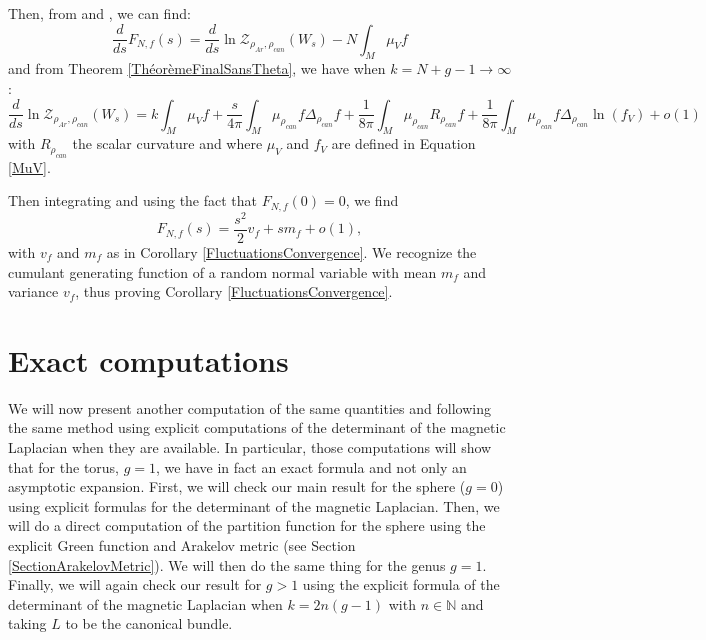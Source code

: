 \documentclass{article}
\theoremstyle{definition}
\theoremstyle{remark}
\begin{document}
Then, from \cite[Section 1.3.1]{ameur2025freeenergyfluctuationsrandom} and \cite[Section 1.3.2]{ameur2025twodimensionalcoulombgasfluctuations}, we can find: $$ \frac{d}{ds} F_{N,f}(s)=\frac{d}{ds} \ln \mathcal{Z}_{\rho_{Ar},\rho_{can}}(W_{s})-N\int_{M} \mu_{V}f $$ and from Theorem \ref{ThéorèmeFinalSansTheta}, we have when $k=N+g-1\to \infty$: $$\frac{d}{ds}\ln \mathcal{Z}_{\rho_{Ar},\rho_{can}}(W_{s})=k\int_{M} \mu_{V} f + \frac{s}{4\pi}\int_{M} \mu_{\rho_{can}} f \Delta_{\rho_{can}} f +\frac{1}{8\pi}\int_{M}\mu_{\rho_{can}}R_{\rho_{can}}f+\frac{1}{8\pi}\int_{M} \mu_{\rho_{can}} f\Delta_{\rho_{can}}\ln(f_{V})+o(1) $$ with $R_{\rho_{can}}$ the scalar curvature and where $\mu_{V}$ and $f_{V}$ are defined in Equation \eqref{MuV}.

Then integrating and using the fact that $F_{N,f}(0)=0$, we find $$F_{N,f}(s) = \frac{s^{2}}{2}v_{f}+sm_{f}+o(1), $$ with $v_{f}$ and $m_{f}$ as in Corollary \ref{FluctuationsConvergence}. We recognize the cumulant generating function of a random normal variable with mean $m_{f}$ and variance $v_{f}$, thus proving Corollary \ref{FluctuationsConvergence}.
\appendix
\section{Exact computations}
We will now present another computation of the same quantities and following the same method using explicit computations of the determinant of the magnetic Laplacian when they are available. In particular, those computations will show that for the torus, $g=1$, we have in fact an exact formula and not only an asymptotic expansion. First, we will check our main result for the sphere ($g=0$) using explicit formulas for the determinant of the magnetic Laplacian. Then, we will do a direct computation of the partition function for the sphere using the explicit Green function and Arakelov metric (see Section \ref{SectionArakelovMetric}). We will then do the same thing for the genus $g=1$. Finally, we will again check our result for $g>1$ using the explicit formula of the determinant of the magnetic Laplacian when $k=2n(g-1)$ with $n \in \mathbb{N}$ and taking $L$ to be the canonical bundle.
\end{document}
